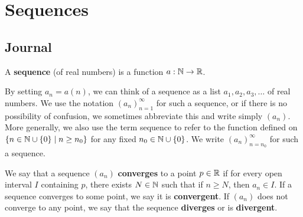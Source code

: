 \documentclass[../main.tex]{subfiles}
\begin{document}
\chapter{Sequences}\label{sct:15}
\section{Journal}
\begin{definition}\label{dfn:15.1}
    A \textbf{sequence} (of real numbers) is a function $a:\mathbb{N}\to\mathbb{R}$.\par
    By setting $a_n=a(n)$, we can think of a sequence as a list $a_1,a_2,a_3,\dots$ of real numbers. We use the notation $(a_n)_{n=1}^\infty$ for such a sequence, or if there is no possibility of confusion, we sometimes abbreviate this and write simply $(a_n)$. More generally, we also use the term sequence to refer to the function defined on $\{n\in\mathbb{N}\cup\{0\}\mid n\geq n_0\}$ for any fixed $n_0\in\mathbb{N}\cup\{0\}$. We write $(a_n)_{n=n_0}^\infty$ for such a sequence.
\end{definition}

\begin{definition}\label{dfn:15.2}
    We say that a sequence $(a_n)$ \textbf{converges} to a point $p\in\mathbb{R}$ if for every open interval $I$ containing $p$, there exists $N\in\mathbb{N}$ such that if $n\geq N$, then $a_n\in I$. If a sequence converges to some point, we say it is \textbf{convergent}. If $(a_n)$ does not converge to any point, we say that the sequence \textbf{diverges} or is \textbf{divergent}.
\end{definition}
\end{document}
